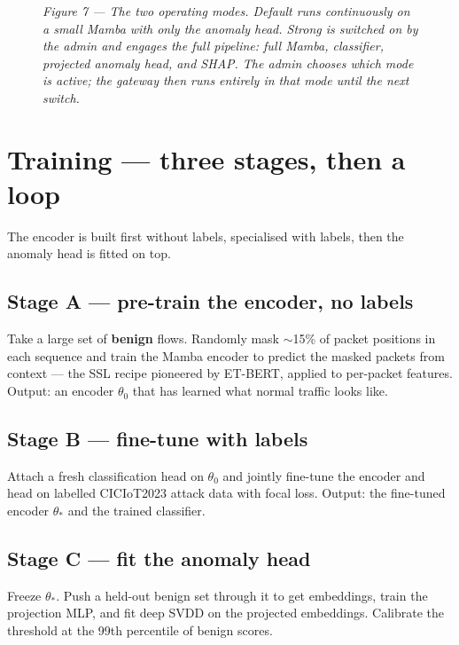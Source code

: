 \documentclass[11pt,a4paper]{article}
\begin{document}
\begin{figure}[H]
\caption*{\small\textit{Figure 7 --- The two operating modes. Default runs continuously on a small Mamba with only the anomaly head. Strong is switched on by the admin and engages the full pipeline: full Mamba, classifier, projected anomaly head, and SHAP. The admin chooses which mode is active; the gateway then runs entirely in that mode until the next switch.}}
\end{figure}

\section{Training --- three stages, then a loop}

The encoder is built first without labels, specialised with labels, then the anomaly head is fitted on top.

\subsection{Stage A --- pre-train the encoder, no labels}
Take a large set of \textbf{benign} flows. Randomly mask $\sim$15\% of packet positions in each sequence and train the Mamba encoder to predict the masked packets from context --- the SSL recipe pioneered by ET-BERT, applied to per-packet features. Output: an encoder $\theta_0$ that has learned what normal traffic looks like.

\subsection{Stage B --- fine-tune with labels}
Attach a fresh classification head on $\theta_0$ and jointly fine-tune the encoder and head on labelled CICIoT2023 attack data with focal loss. Output: the fine-tuned encoder $\theta_*$ and the trained classifier.

\subsection{Stage C --- fit the anomaly head}
Freeze $\theta_*$. Push a held-out benign set through it to get embeddings, train the projection MLP, and fit deep SVDD on the projected embeddings. Calibrate the threshold at the 99th percentile of benign scores.
\end{document}
